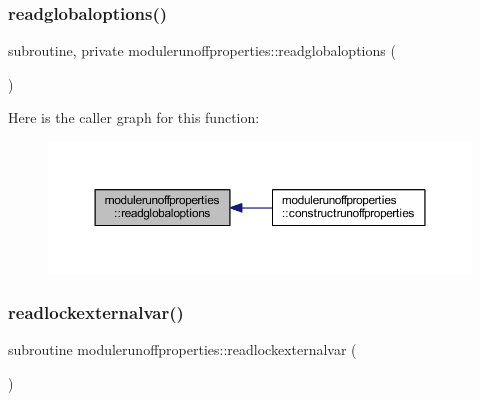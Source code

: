 \subsubsection{\texorpdfstring{readglobaloptions()}{readglobaloptions()}}
{\footnotesize\ttfamily subroutine, private modulerunoffproperties\+::readglobaloptions (\begin{DoxyParamCaption}{ }\end{DoxyParamCaption})\hspace{0.3cm}{\ttfamily [private]}}

Here is the caller graph for this function\+:\nopagebreak
\begin{figure}[H]
\begin{center}
\leavevmode
\includegraphics[width=350pt]{namespacemodulerunoffproperties_a17a988c6d85ad5ccca32ec7064ede8f2_icgraph}
\end{center}
\end{figure}
\mbox{\label{namespacemodulerunoffproperties_a281dc2c8e1ac168295c6bbff10a4bf54}} 
\subsubsection{\texorpdfstring{readlockexternalvar()}{readlockexternalvar()}}
{\footnotesize\ttfamily subroutine modulerunoffproperties\+::readlockexternalvar (\begin{DoxyParamCaption}{ }\end{DoxyParamCaption})\hspace{0.3cm}{\ttfamily [private]}}


